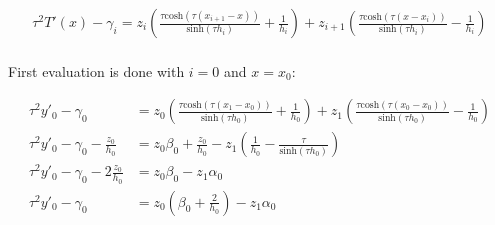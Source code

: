 \documentclass{article}
\begin{document}
\begin{multline*}
           \tau^2T'(x)
           -
           \gamma_i
           =
           z_i
           (
             \frac{
               \tau\mathrm{cosh}(\tau(x_{i+1}-x))
             }
             {
               \textrm{sinh}(\tau h_i)
             }
             +
             \frac {
               1
             }
             {
               h_i
             }
           )
           +
           z_{i+1}
           (
             \frac{
               \tau\textrm{cosh}(\tau(x-x_{i}))
             }
             {
               \textrm{sinh}(\tau h_i)
             }
             -
             \frac {
               1
             }
             {
               h_i
             }
           )
  \end{multline*} \\

  First evaluation is done with $i=0$ and $x=x_0$:

  \begin{align*}
           \tau^2y'_0
           -
           \gamma_0
           &=
           z_0
           (
             \frac{
               \tau\mathrm{cosh}(\tau(x_{1}-x_0))
             }
             {
               \textrm{sinh}(\tau h_0)
             }
             +
             \frac {
               1
             }
             {
               h_0
             }
           )
           +
           z_{1}
           (
             \frac{
               \tau\textrm{cosh}(\tau(x_0-x_{0}))
             }
             {
               \textrm{sinh}(\tau h_0)
             }
             -
             \frac {
               1
             }
             {
               h_0
             }
           )
           \\
           \tau^2y'_0
           -
           \gamma_0
           -
           \frac{z_0}{h_0}
           &=
           z_0\beta_0
           +
           \frac{z_0}{h_0}
           -
           z_{1}
           (
             \frac {
               1
             }
             {
               h_0
             }
             -
             \frac{
               \tau
             }
             {
               \textrm{sinh}(\tau h_0)
             }
           )
           \\
           \tau^2y'_0
           -
           \gamma_0
           -
           2\frac{z_0}{h_0}
           &=
           z_0\beta_0
           -
           z_{1}\alpha_0
           \\
           \tau^2y'_0
           -
           \gamma_0
           &=
           z_0
           (
             \beta_0
             +
             \frac{2}{h_0}
           )
           -
           z_{1}\alpha_0
  \end{align*}
\end{document}
